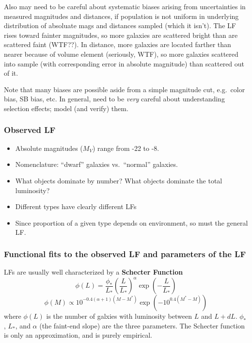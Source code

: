 \documentclass{article}
\newcommand{\mynotes}[1]{\textcolor{cadmiumgreen}{#1}}
\begin{document}
Also may need to be careful about systematic biases arising from
uncertainties in measured magnitudes and distances, if population is
not uniform in underlying distribution of absoluate mags and distances
sampled (which it isn't). The LF rises toward fainter magnitudes, so
more galaxies are scattered bright than are scattered faint
\mynotes{(WTF??)}. In distance, more galaxies are located farther
than nearer because of volume element \mynotes{(seriously, WTF)}, so
more galaxies scattered into sample (with corresponding error in
absolute magnitude) than scattered out of it.

Note that many biases are possible aside from a simple magnitude cut, e.g.\
color bias, SB bias, etc. In general, need to be \emph{very} careful about
understanding selection effects; model (and verify) them.

\subsubsection{Observed LF}
\begin{itemize}
    \item Absolute magnitudes ($M_{V}$) range from -22 to -8.
    \item Nomenclature: ``dwarf'' galaxies vs.\ ``normal'' galaxies.
    \item What objects dominate by number? What objects dominate the
        total luminosity?
    \item Different types have clearly different LFs
    \item Since proportion of a given type depends on environment, so
        must the general LF.
\end{itemize}

\subsubsection{Functional fits to the observed LF and parameters of the LF}
LFs are usually well characterized by a \textbf{Schecter Function}
\[
    \phi(L) = \frac{\phi_{*}}{L_{*}}\left(\frac{L}{L_{*}}\right)^{\alpha}
    \exp\left(-\frac{L}{L_{*}}\right)
\]
\[
    \phi(M) \propto 10^{-0.4\left(\alpha+1\right)\left(M-M^*\right)}
    \exp\left(-10^{0.4(M^{*}-M)}\right)
\]
where $\phi(L)$ is the number of galxies with luminosity between
$L$ and $L + dL$.  $\phi_{*}$, $L_{*}$, and $\alpha$ (the faint-end slope)
are the three parameters. The Schecter function is only an approximation, and
is purely empirical.
\end{document}
